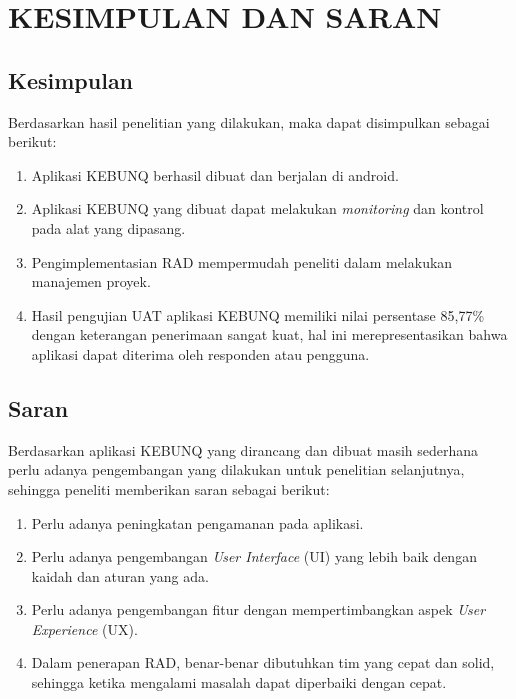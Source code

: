 \chapter{KESIMPULAN DAN SARAN}

%
\vspace{4.5pt}

\begin{flushleft}
    \begin{justify}
        \section{Kesimpulan}
        Berdasarkan hasil penelitian yang dilakukan, maka dapat disimpulkan sebagai berikut:
        \begin{enumerate}
            \item Aplikasi KEBUNQ berhasil dibuat dan berjalan di android.
            \item Aplikasi KEBUNQ yang dibuat dapat melakukan \emph{monitoring} dan kontrol pada alat yang dipasang.
            \item Pengimplementasian RAD mempermudah peneliti dalam melakukan manajemen proyek.
            \item Hasil pengujian UAT aplikasi KEBUNQ memiliki nilai persentase 85,77\% dengan keterangan penerimaan sangat kuat, hal ini merepresentasikan bahwa aplikasi dapat diterima oleh responden atau pengguna.\\
        \end{enumerate}

        \section{Saran}
        Berdasarkan aplikasi KEBUNQ yang dirancang dan dibuat masih sederhana perlu adanya pengembangan yang dilakukan untuk penelitian selanjutnya, sehingga peneliti memberikan saran sebagai berikut:
        \begin{enumerate}
            \item Perlu adanya peningkatan pengamanan pada aplikasi.
            \item Perlu adanya pengembangan \emph{User Interface} (UI) yang lebih baik dengan kaidah dan aturan yang ada.
            \item Perlu adanya pengembangan fitur dengan mempertimbangkan aspek \emph{User Experience} (UX).
            \item Dalam penerapan RAD, benar-benar dibutuhkan tim yang cepat dan solid, sehingga ketika mengalami masalah dapat diperbaiki dengan cepat.
        \end{enumerate}

            
    \end{justify}
        
\end{flushleft}

\newpage